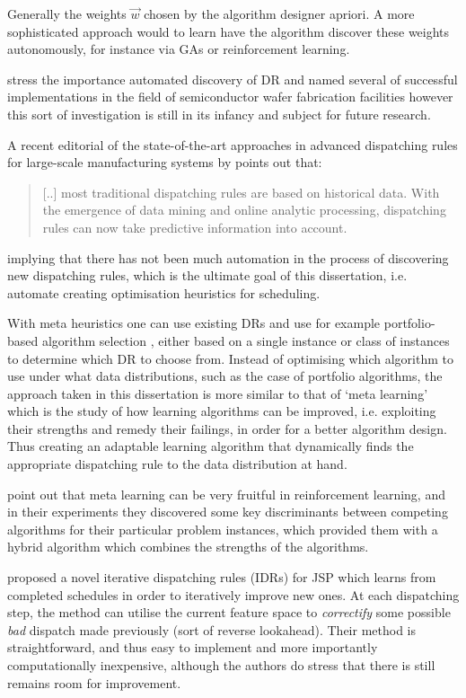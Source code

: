 \documentclass[smallextended]{svjour3}
\begin{document}
	Generally the weights $\vec{w}$ chosen by the algorithm designer apriori. 
	A more sophisticated approach would to learn have the algorithm discover these weights autonomously, for instance via GAs or reinforcement learning. 
	
	\cite{Monch13} stress the importance automated discovery of DR and named several of successful implementations in the field of semiconductor wafer fabrication facilities however this sort of investigation is still in its infancy and subject for future research.
	
	A recent editorial of the state-of-the-art approaches in advanced dispatching rules for large-scale manufacturing systems by \citet{Chen13} points out that:
	\begin{quote}
		[..] most traditional dispatching rules are based on historical data. With the emergence of data mining and online analytic processing, dispatching rules can now take predictive information into account.
	\end{quote}
	implying that there has not been much automation in the process of discovering new dispatching rules, which is the ultimate goal of this dissertation, i.e. automate creating optimisation heuristics for scheduling. 
	
	With meta heuristics one can use existing DRs and use for example portfolio-based algorithm selection \citep{Rice76,Gomes01}, either based on a single instance or class of instances \citep{Xu07} to determine which DR to choose from. 
	Instead of optimising which algorithm to use under what data distributions, such as the case of portfolio algorithms, the approach taken in this dissertation is more similar to that of `meta learning' \citep{Vilalta02} which is the study of how learning algorithms can be improved, i.e. exploiting their strengths and remedy their failings, in order for a better algorithm design. Thus creating an adaptable learning algorithm that dynamically finds the appropriate dispatching rule  to the data distribution at hand. 
	
	\citet{Kalyanakrishnan11} point out that meta learning can be very fruitful in reinforcement learning, and in their experiments they discovered some key discriminants between competing algorithms for their particular problem instances, which provided them with a hybrid algorithm which combines the strengths of the algorithms.
	
	\citet{Nguyen13} proposed a novel iterative dispatching rules (IDRs) for JSP which learns from completed schedules in order to iteratively improve new ones. At each dispatching step, the method can utilise the current feature space to \emph{correctify} some possible \emph{bad} dispatch made previously (sort of reverse lookahead).
	Their method is straightforward, and thus easy to implement and more importantly computationally inexpensive, although the authors do stress that there is still remains room for improvement. 
	
\end{document}
